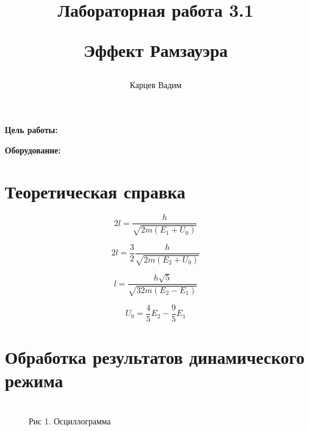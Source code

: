 \documentclass[12pt]{article}
\author{Карцев Вадим}
\title{Лабораторная работа 3.1

Эффект Рамзауэра}
\begin{document}
  \maketitle

  \textbf{Цель работы:}  %

  \textbf{Оборудование:}  %

  \section{Теоретическая справка}


    \begin{equation}
      2 l = \frac{h}{\sqrt{2 m \left(E_1 + U_0\right)}}
      \label{eq:max_gain}
    \end{equation}

    \begin{equation}
      2 l = \frac{3}{2} \frac{h}{\sqrt{2 m \left(E_2 + U_0\right)}}
      \label{eq:min_weakening}
    \end{equation}

    \begin{equation}
      l = \frac{h \sqrt{5}}{\sqrt{32 m \left( E_2 - E_1 \right)}}
      \label{eq:atom_size}
    \end{equation}

    \begin{equation}
      U_0 = \frac{4}{5} E_2 - \frac{9}{5} E_1
      \label{eq:potential_pit_depth}
    \end{equation}

  \newpage
  \section{Обработка результатов динамического режима}

  \begin{figure}[h!]
        \\
        Рис 1. Осциллограмма
    \label{fig:oscillograme}
  \end{figure}
\end{document}
